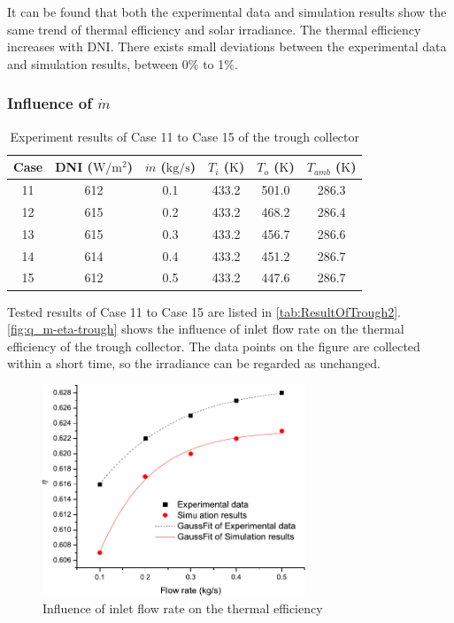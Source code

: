 It can be found that both the experimental data and simulation results show the same trend of thermal efficiency and solar irradiance.
The thermal efficiency increases with DNI.
There exists small deviations between the experimental data and simulation results, between 0\% to 1\%.

\subsubsection{Influence of $\dot{m}$}

\begin{table}[htbp]\footnotesize
	\caption{Experiment results of Case 11 to Case 15 of the trough collector}
	\centering
	\begin{tabular}{cccccc}
		\toprule
		Case	& DNI ($\mathrm{W/m^2}$)	&	$\dot{m}$ ($\mathrm{kg/s}$)			&	$T_i$ ($\mathrm{K}$)	&	$T_o$ ($\mathrm{K}$)		&	$T_{amb}$ ($\mathrm{K}$)\\
		\midrule
		11	&	612	&	0.1	&	433.2	&	501.0	&	286.3\\
		12	&	615	&	0.2	&	433.2	&	468.2	&	286.4\\
		13	&	615	&	0.3	&	433.2	&	456.7	&	286.6	\\
		14	&	614	&	0.4	&	433.2	&	451.2	&	286.7\\
		15	&	612	&	0.5	&	433.2	&	447.6	&	286.7\\
		\bottomrule
	\end{tabular}
	
	\label{tab:ResultOfTrough2}
\end{table}
Tested results of Case 11 to Case 15 are listed in \autoref{tab:ResultOfTrough2}.
\autoref{fig:q_m-eta-trough} shows the influence of inlet flow rate on the thermal efficiency of the trough collector. The data points on the figure are collected within a short time, so the irradiance can be regarded as unchanged.
\begin{figure}[!ht]
\centering
\includegraphics[width=0.7\textwidth]{fig/q_m-eta-trough}
\caption{Influence of inlet flow rate on the thermal efficiency}
\label{fig:q_m-eta-trough}
\end{figure}

